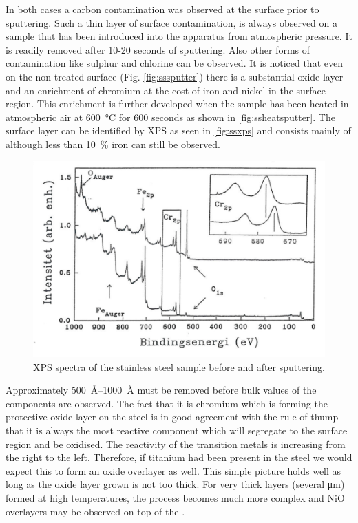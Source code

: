 In both cases a carbon contamination was observed at the surface prior to sputtering. Such a thin layer of surface contamination, is always observed on a sample that has been introduced into the apparatus from atmospheric pressure. It is readily removed after 10-20 seconds of sputtering. Also other forms of contamination like sulphur and chlorine can be observed. It is noticed that even on the non-treated surface (Fig. \ref{fig:sssputter}) there is a substantial oxide layer and an enrichment of chromium at the cost of iron and nickel in the surface region. This enrichment is further developed when the sample has been heated in atmospheric air at \SI{600}{\degreeCelsius} for 600 seconds as shown in \autoref{fig:ssheatsputter}. The surface layer can be identified by XPS as seen in \autoref{fig:ssxps} and consists mainly of  although less than \SI{10}{\percent} iron can still be observed.

\begin{figure}[h!]
	\begin{center}
	\includegraphics[scale=4]{figures/07_10.png}
	\caption{XPS spectra of the stainless steel sample before and after sputtering.}
	\label{fig:ssxps}
	\end{center}
\end{figure}

Approximately \SIrange{500}{1000}{\angstrom} must be removed before bulk values of the components are observed. The fact that it is chromium which is forming the protective oxide layer on the steel is in good agreement with the rule of thump that it is always the most reactive component which will segregate to the surface region and be oxidised. The reactivity of the transition metals is increasing from the right to the left. Therefore, if titanium had been present in the steel we would expect this to form an oxide overlayer as well. This simple picture holds well as long as the oxide layer grown is not too thick. For very thick layers (several \si{\micro m}) formed at high temperatures, the process becomes much more complex and NiO overlayers may be observed on top of the  \cite{alstrup}.

